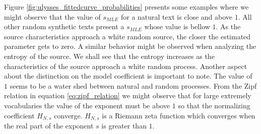 Figure \ref{fig:ulysses_fittedcurve_probabilities} presents some examples where we might observe that
the value of $s_{MLE}$ for a natural text is close and above $1$. All other random synthetic texts
present a $s_{MLE}$ whose value is bellow $1$. As the source characteristics approach a white random
source, the closer the estimated parameter gets to zero. A similar behavior might be observed 
when analyzing the entropy of the source. We shall see that the entropy increases as the characteristics
of the source approach a white random process.
Another aspect about the distinction on the model coefficient is important to note.
The value of $1$ seems to be a water shed between natural and random processes. 
From the Zipf relation in equation \ref{eq:zipf_relation} we might observe that for large extremely vocabularies
the value of the exponent must be above $1$ so that the normalizing coefficient $H_{N,s}$ converge.
$H_{N,s}$ is a Riemann zeta function which converges when the real part of the exponent $s$ is greater than $1$.

